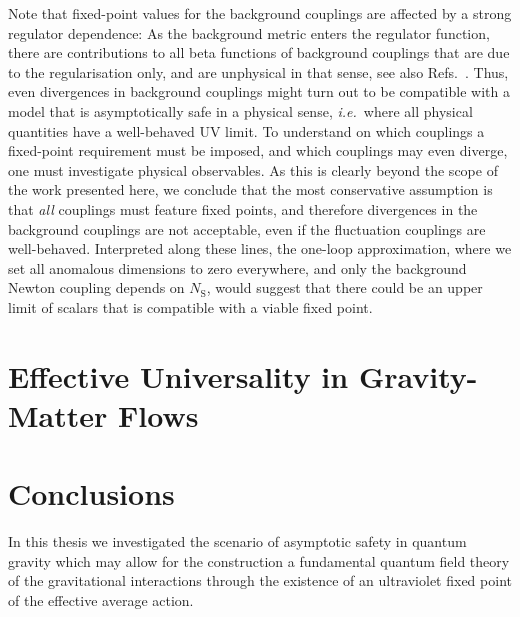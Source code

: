 \documentclass[11pt]{book}
\newcommand\NS{ N_{\scriptscriptstyle{\mathrm{S}}} }
\newcommand\ie{\textit{i.e.}\ }
\numberwithin{equation}{chapter}
\begin{document}
Note that fixed-point values for the background couplings are affected by a strong regulator dependence:
As the background metric enters the regulator function,
there are contributions to all beta functions of background couplings that are due to the regularisation only,
and are unphysical in that sense, see also
Refs.~\cite{Folkerts:2011jz, Litim:2002ce, Litim:2002hj, Bridle:2013sra}.
Thus, even divergences in background couplings might turn out to be compatible with a model that
is asymptotically safe in a physical sense, \ie where all physical quantities have a well-behaved UV limit.
To understand on which couplings a fixed-point requirement must be imposed,
and which couplings may even diverge, one must investigate physical observables.
As this is clearly beyond the scope of the work presented here, we conclude that the most conservative
assumption is that \emph{all} couplings must feature fixed points,
and therefore divergences in the background couplings are not acceptable,
even if the fluctuation couplings are well-behaved. Interpreted along these lines,
the one-loop approximation, where we set all anomalous dimensions to zero everywhere,
and only the background Newton coupling depends on $\NS$,
would suggest that there could be an upper limit of scalars that is compatible with a viable fixed point.




\chapter{Effective Universality in Gravity-Matter Flows}
\label{ch:jan}




\chapter*{Conclusions}

In this thesis we investigated the scenario of asymptotic safety in quantum gravity
which may allow for the construction a fundamental quantum field theory of the
gravitational interactions through the existence of an ultraviolet fixed point
of the effective average action.
\end{document}
